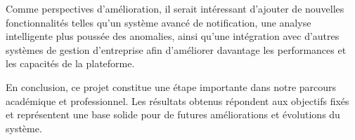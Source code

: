 Comme perspectives d’amélioration, il serait intéressant d’ajouter de nouvelles fonctionnalités telles qu’un système avancé de notification, une analyse intelligente plus poussée des anomalies, ainsi qu’une intégration avec d’autres systèmes de gestion d’entreprise afin d’améliorer davantage les performances et les capacités de la plateforme.

En conclusion, ce projet constitue une étape importante dans notre parcours académique et professionnel. Les résultats obtenus répondent aux objectifs fixés et représentent une base solide pour de futures améliorations et évolutions du système.